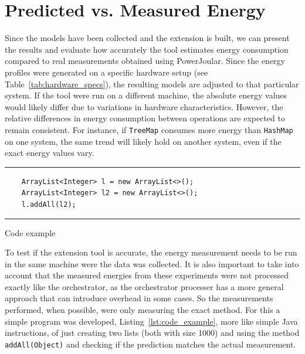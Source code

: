 \section{Predicted vs. Measured Energy} \label{sec:predicted_vs_measured_energy}

Since the models have been collected and the extension is built, we can present the results and evaluate how accurately the tool estimates energy consumption compared to real measurements obtained using PowerJoular. Since the energy profiles were generated on a specific hardware setup (see Table~\ref{tab:hardware_specs}), the resulting models are adjusted to that particular system. If the tool were run on a different machine, the absolute energy values would likely differ due to variations in hardware characteristics. However, the relative differences in energy consumption between operations are expected to remain consistent. For instance, if \texttt{TreeMap} consumes more energy than \texttt{HashMap} on one system, the same trend will likely hold on another system, even if the exact energy values vary.

\begin{listing}[H]
\noindent\rule{\linewidth}{0.4pt}
\begin{verbatim}
    ArrayList<Integer> l = new ArrayList<>();
    ArrayList<Integer> l2 = new ArrayList<>();
    l.addAll(l2);
\end{verbatim}
\noindent\rule{\linewidth}{0.4pt}
\caption{Code example}            
\label{lst:code_example}
\end{listing}

To test if the extension tool is accurate, the energy measurement needs to be run in the same machine were the data was collected. It is also important to take into account that the measured energies from these experiments were not processed exactly like the orchestrator, as the orchestrator processer has a more general approach that can introduce overhead in some cases. So the measurements performed, when possible, were only measuring the exact method.
For this a simple program was developed, Listing~\ref{lst:code_example}, more like simple Java instructions, of just creating two lists (both with size 1000) and using the method \texttt{addAll(Object)} and checking if the prediction matches the actual measurement.

